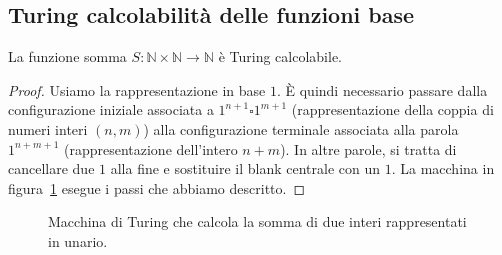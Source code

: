 
\subsection{Turing calcolabilità delle funzioni base}


\begin{lemm}
La funzione somma $S\colon\mathbb N\times\mathbb N\to\mathbb N$ è Turing calcolabile.
\end{lemm}

\begin{proof}
Usiamo la rappresentazione in base $1$. È quindi necessario passare dalla 
configurazione iniziale associata a $1^{n+1}\square 1^{m+1}$ 
(rappresentazione della coppia di numeri interi $(n,m)$) alla 
configurazione terminale associata alla parola $1^{n+m+1}$ 
(rappresentazione dell'intero $n+m$). In altre parole, si 
tratta di cancellare due $1$ alla fine e sostituire il blank 
centrale con un $1$. La macchina in figura~\ref{fig:turing-somma} esegue i passi che abbiamo descritto.
\end{proof}

\begin{figure}[H]
\centering
{}
\caption{Macchina di Turing che calcola la somma di due interi rappresentati in unario.}
\label{fig:turing-somma}
\end{figure}

